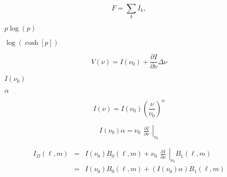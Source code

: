 {\newpage\clearpage
{}%
\begin{displaymath}
F = \sum_k I_k,
\end{displaymath}%
\lthtmldisplayZ
\lthtmlcheckvsize\clearpage}

{\newpage\clearpage
{}%
$p\log(p)$%
\lthtmlinlinemathZ
\lthtmlcheckvsize\clearpage}

{\newpage\clearpage
{}%
$\log(\cosh[p])$%
\lthtmlinlinemathZ
\lthtmlcheckvsize\clearpage}

{\newpage\clearpage
{}%
\begin{displaymath}
	V(\nu) = I(\nu_0) + \frac{\partial I}{\partial\nu}\Delta\nu
\end{displaymath}%
\lthtmldisplayZ
\lthtmlcheckvsize\clearpage}

{\newpage\clearpage
{}%
$I(\nu_0)$%
\lthtmlinlinemathZ
\lthtmlcheckvsize\clearpage}

{\newpage\clearpage
{}%
$\alpha$%
\lthtmlinlinemathZ
\lthtmlcheckvsize\clearpage}

{\newpage\clearpage
{}%
\begin{displaymath}
	I(\nu) = I(\nu_0)(\frac{\nu}{\nu_0})^\alpha
\end{displaymath}%
\lthtmldisplayZ
\lthtmlcheckvsize\clearpage}

{\newpage\clearpage
{}%
\begin{displaymath}
	I(\nu_0)\alpha = \nu_0\left.
\begin{array}{c}\displaystyle\frac{\partial I}{\partial\nu}\end{array}\right|_{\nu_0}
\end{displaymath}%
\lthtmldisplayZ
\lthtmlcheckvsize\clearpage}

{\newpage\clearpage
{}%
\begin{eqnarray*}
I_D(\ell,m) &=& I(\nu_0) B_0(\ell,m) + \nu_0
\left.\begin{array}{c}\displaystyle\frac{\partial I}{\partial\nu}\end{array}
\right|_{\nu_0}B_1(\ell,m)\\
	  &=& I(\nu_0) B_0(\ell,m) + (I(\nu_0)\alpha)B_1(\ell,m)
\end{eqnarray*}%
\lthtmldisplayZ
\lthtmlcheckvsize\clearpage}

